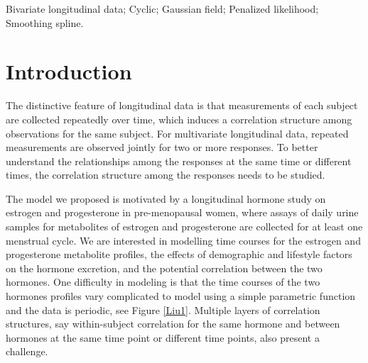 \documentclass[article,lineno]{biometrika}
\begin{document}
\begin{keywords}
Bivariate longitudinal data; Cyclic; Gaussian field; Penalized likelihood; Smoothing spline.
\end{keywords}

\section{Introduction}

The distinctive feature of longitudinal data is that measurements of each subject are collected repeatedly over time, which induces a correlation structure among observations for the same subject. 
For multivariate longitudinal data, repeated measurements are observed jointly for two or more responses. To better understand the relationships among the responses at the same time or different times, the correlation structure among the responses needs to be studied. 


The model we proposed is motivated by a longitudinal hormone study on estrogen and progesterone in pre-menopausal women, where assays of daily urine samples for metabolites of estrogen and progesterone are collected for at least one menstrual cycle. 
We are interested in modelling  time courses for the estrogen and progesterone metabolite profiles, the effects of demographic and lifestyle factors on the hormone excretion, and the potential correlation between the two hormones.  
One difficulty in modeling is that the time courses of the two hormones profiles vary complicated
to model using a simple parametric function and the data is periodic, see Figure \ref{Liu1}. 
Multiple layers of correlation structures, say within-subject correlation for the same hormone and between hormones at the same time point or different time points, also present a challenge.
\end{document}
